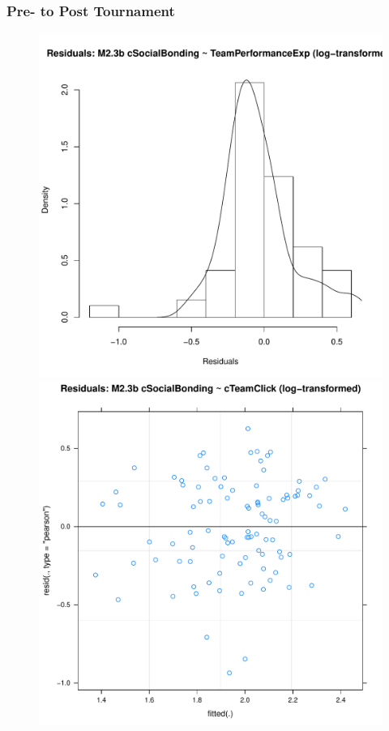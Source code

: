       \subsubsection{Pre- to Post Tournament\label{app8:MLM23b}}

          
          \restoregeometry



      \begin{figure}[htbp]
        \includegraphics[scale =.4]{images/MLM23bLogHist.pdf}
        \includegraphics[scale =.4]{images/MLM23bLogScatter.pdf}

\end{figure}
